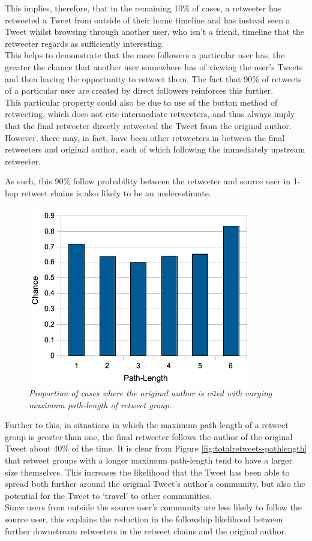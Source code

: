 This implies, therefore, that in the remaining 10\% of cases, a retweeter has retweeted a Tweet from outside of their home timeline and has instead seen a Tweet whilst browsing through another user, who isn't a friend, timeline that the retweeter regards as sufficiently interesting.\\
This helps to demonstrate that the more followers a particular user has, the greater the chance that another user somewhere has of viewing the user's Tweets and then having the opportunity to retweet them. The fact that 90\% of retweets of a particular user are created by direct followers reinforces this further.\\
This particular property could also be due to use of the button method of retweeting, which does not cite intermediate retweeters, and thus always imply that the final retweeter directly retweeted the Tweet from the original author. However, there may, in fact, have been other retweeters in between the final retweeters and original author, each of which following the immediately upstream retweeter.

As such, this 90\% follow probability between the retweeter and source user in 1-hop retweet chains is also likely to be an underestimate.

\begin{figure}[h]
\centering
\includegraphics[scale=0.6]{3.Chapter1/Media/mentionsoriginal-pathlength.png} 
\caption{\textit{Proportion of cases where the original author is cited with varying maximum path-length of retweet group.}}
\label{fig:citation-pathlength}
\end{figure}

Further to this, in situations in which the maximum path-length of a retweet group is \textit{greater} than one, the final retweeter follows the author of the original Tweet about 40\% of the time. It is clear from Figure \ref{fig:totalretweets-pathlength} that retweet groups with a longer maximum path-length tend to have a larger size themselves. This increases the likelihood that the Tweet has been able to spread both further around the original Tweet's author's community, but also the potential for the Tweet to `travel' to other communities.\\
Since users from outside the source user's community are less likely to follow the source user, this explains the reduction in the followship likelihood between further downstream retweeters in the retweet chains and the original author.


